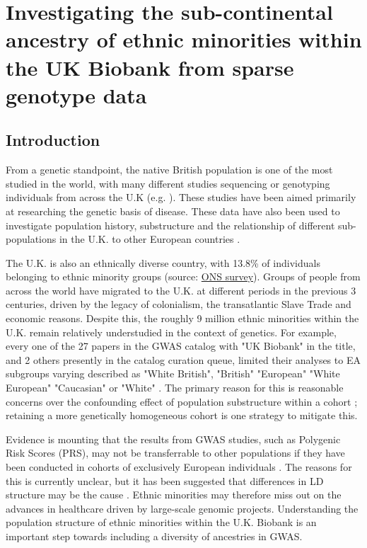 \chapter{Investigating the sub-continental ancestry of ethnic minorities within the UK Biobank from sparse genotype data}
\label{chapterlabel3}

\section{Introduction}

From a genetic standpoint, the native British population is one of the most studied in the world, with many different studies sequencing or genotyping individuals from across the U.K (e.g. \cite{bycroft2018uk, Leslie2015, turnbull2018introducing, uk10k2015uk10k}). These studies have been aimed primarily at researching the genetic basis of disease. These data have also been used to investigate population history, substructure  and the relationship of different sub-populations in the U.K. to other European countries \cite{Leslie2015, schiffels2016iron, liu2020human}.  

The U.K. is also an ethnically diverse country, with 13.8\% of individuals belonging to ethnic minority groups (source: \href{https://www.ons.gov.uk/peoplepopulationandcommunity/populationandmigration/populationestimates/articles/researchreportonpopulationestimatesbyethnicgroupandreligion/2019-12-04}{ONS survey}). Groups of people from across the world have migrated to the U.K. at different periods in the previous 3 centuries, driven by the legacy of colonialism, the transatlantic Slave Trade and economic reasons. Despite this, the roughly 9 million ethnic minorities within the U.K. remain relatively understudied in the context of genetics. For example, every one of the 27 papers in the GWAS catalog with "UK Biobank" in the title, and 2 others presently in the catalog curation queue, limited their analyses to EA subgroups varying described as "White British", "British" "European" "White European" "Caucasian" or "White" \cite{manolio2019using}. The primary reason for this is reasonable concerns over the confounding effect of population substructure within a cohort \cite{hellwege2017population}; retaining a more genetically homogeneous cohort is one strategy to mitigate this. 

Evidence is mounting that the results from GWAS studies, such as Polygenic Risk Scores (PRS), may not be transferrable to other populations if they have been conducted in cohorts of exclusively European individuals \cite{kuchenbaecker2019transferability, martin2017human, bustamante2011genomics}. The reasons for this is currently unclear, but it has been suggested that differences in LD structure may be the cause \cite{vilhjalmsson2015modeling}. Ethnic minorities may therefore miss out on the advances in healthcare driven by large-scale genomic projects. Understanding the population structure of ethnic minorities within the U.K. Biobank is an important step towards including a diversity of ancestries in GWAS. 

